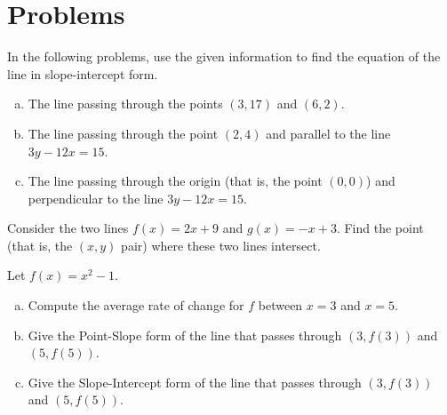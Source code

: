 \documentclass[12pt]{amsart}
\begin{document}
\newpage
\section{Problems}

\begin{thm}[16 Points]\label{ex5}
  In the following problems, use the given information to find the equation of the line in slope-intercept form.
  \begin{enumerate}[(a)]
  \item
    The line passing through the points $(3,17)$ and $(6,2)$.
    \vspace{1in}
  \item
    The line passing through the point $(2, 4)$ and parallel to the line $3y - 12x = 15$.
    \vspace{1in}
  \item
    The line passing through the origin (that is, the point $(0,0)$) and perpendicular to the line $3y - 12x = 15$.
    \vspace{1in}
  \end{enumerate}
  \vspace{1in}
\end{thm}


\begin{thm}[16 Points]\label{ex10}
  Consider the two lines $f(x) = 2x + 9$ and $g(x) = -x + 3$.
  Find the point (that is, the $(x,y)$ pair) where these two lines intersect.
  \vspace{2in}
\end{thm}

\newpage

\begin{thm}[16 Points]\label{ex9}
  Let $f(x) = x^2 - 1$.
  \begin{enumerate}[(a)]
  \item
    Compute the average rate of change for $f$ between $x = 3$ and $x = 5$.
    \vspace{2in}
  \item
    Give the Point-Slope form of the line that passes through $(3, f(3))$ and $(5, f(5))$.
    \vspace{2in}
  \item
    Give the Slope-Intercept form of the line that passes through $(3, f(3))$ and $(5, f(5))$.
  \end{enumerate}
\end{thm}

\newpage
\end{document}
